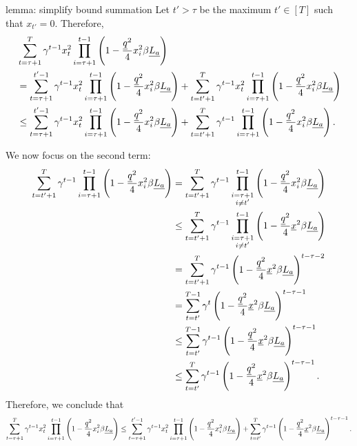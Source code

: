 \begin{proofof}{lemma: simplify bound summation}
Let $t' > \tau$ be the maximum $t' \in [T]$ such that $x_{t'} = 0$. Therefore,
\begin{align*}
& \sum_{t = \tau + 1}^T \gamma^{t-1} x_t^2 \prod_{i = \tau + 1}^{t-1} \left( 1 - \frac{\underline{q} ^2}{4} x_i^2 \beta \underline{L_a} \right) \\
&= \sum_{t = \tau + 1}^{t' - 1} \gamma^{t-1} x_t^2 \prod_{i = \tau + 1}^{t-1} \left( 1 - \frac{\underline{q} ^2}{4} x_i^2 \beta \underline{L_a} \right) + \sum_{t = t' + 1}^T \gamma^{t-1} x_t^2 \prod_{i = \tau + 1}^{t-1} \left( 1 - \frac{\underline{q} ^2}{4} x_i^2 \beta \underline{L_a} \right) \\
&\leq \sum_{t = \tau + 1}^{t' - 1} \gamma^{t-1} x_t^2 \prod_{i = \tau + 1}^{t-1} \left( 1 - \frac{\underline{q} ^2}{4} x_i^2 \beta \underline{L_a} \right) + \sum_{t = t' + 1}^T \gamma^{t-1} \prod_{i = \tau + 1}^{t-1} \left( 1 - \frac{\underline{q} ^2}{4} x_i^2 \beta \underline{L_a} \right).
\end{align*}

We now focus on the second term:
\begin{align*}
\sum_{t = t' + 1}^T \gamma^{t-1} \prod_{i = \tau + 1}^{t-1} \left( 1 - \frac{\underline{q} ^2}{4} x_i^2 \beta \underline{L_a} \right) &= \sum_{t = t' + 1}^T \gamma^{t-1} \prod_{\substack{i = \tau + 1 \\ i \neq t'}}^{t-1} \left( 1 - \frac{\underline{q} ^2}{4} x_i^2 \beta \underline{L_a} \right) \\
&\leq \sum_{t = t' + 1}^T \gamma^{t-1} \prod_{\substack{i = \tau + 1 \\ i \neq t'}}^{t-1} \left( 1 - \frac{\underline{q} ^2}{4} \underline{x}^2 \beta \underline{L_a} \right) \\
&= \sum_{t = t' + 1}^T \gamma^{t-1} \left( 1 - \frac{\underline{q} ^2}{4} \underline{x}^2 \beta \underline{L_a} \right)^{t - \tau - 2} \\
&= \sum_{t = t'}^{T-1} \gamma^{t} \left( 1 - \frac{\underline{q} ^2}{4} \underline{x}^2 \beta \underline{L_a} \right)^{t - \tau - 1} \\
&\leq \sum_{t = t'}^{T-1} \gamma^{t-1} \left( 1 - \frac{\underline{q} ^2}{4} \underline{x}^2 \beta \underline{L_a} \right)^{t - \tau - 1} \\
&\leq \sum_{t = t'}^{T} \gamma^{t-1} \left( 1 - \frac{\underline{q} ^2}{4} \underline{x}^2 \beta \underline{L_a} \right)^{t - \tau - 1}.
\end{align*}
Therefore, we conclude that
\begin{align*}
\sum_{t = \tau + 1}^T \gamma^{t-1} x_t^2 \prod_{i = \tau + 1}^{t-1} \left( 1 - \frac{\underline{q} ^2}{4} x_i^2 \beta \underline{L_a} \right) \leq \sum_{t = \tau + 1}^{t' - 1} \gamma^{t-1} x_t^2 \prod_{i = \tau + 1}^{t-1} \left( 1 - \frac{\underline{q} ^2}{4} x_i^2 \beta \underline{L_a} \right) + \sum_{t = t'}^{T} \gamma^{t-1} \left( 1 - \frac{\underline{q} ^2}{4} \underline{x}^2 \beta \underline{L_a} \right)^{t - \tau - 1}.
\end{align*}


\end{proofof}
